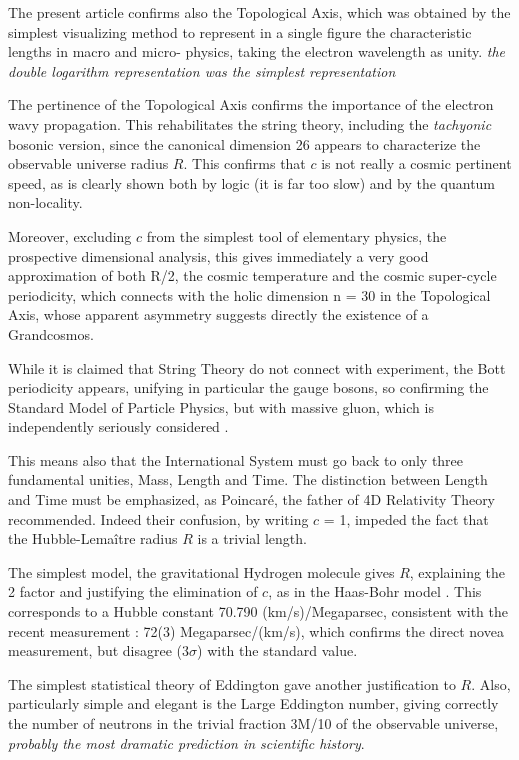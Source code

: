 \documentclass[twoside,draft]{article}
\begin{document}
\begin{sloppypar}
The present article confirms also the Topological Axis, which was obtained by the simplest visualizing method to represent in a single figure the characteristic lengths in macro and micro-
physics, taking the electron wavelength as unity. \textit {the double logarithm representation was the simplest representation}

The pertinence of the Topological Axis confirms
the importance of the electron wavy propagation. This rehabilitates the string theory, including the
\textit{tachyonic} bosonic version, since the canonical dimension 26 appears to characterize the observable
universe radius $R$. This confirms that $c$ is not really a cosmic pertinent speed, as is clearly shown both by
logic (it is far too slow) and by the quantum non-locality.

Moreover, excluding $c$ from the simplest tool of elementary physics, the prospective dimensional
analysis, this gives immediately a very good approximation of both R/2, the cosmic temperature and the cosmic super-cycle periodicity, which connects with the holic dimension n = 30 in the
Topological Axis, whose apparent asymmetry suggests directly the existence of a Grandcosmos.

While it is claimed that String Theory do not connect with experiment, the Bott periodicity
appears, unifying in particular the gauge bosons, so confirming the Standard Model of Particle Physics, but with
massive gluon, which is independently seriously considered \cite{Salingaros}.

This means also that the International System must go back to only three fundamental unities,
Mass, Length and Time. The distinction between Length and Time must be emphasized, as
Poincar\'{e}, the father of 4D Relativity Theory recommended. Indeed their confusion, by writing $c$ =
1, impeded the fact that the Hubble-Lema\^{i}tre radius $R$ is a trivial length.

The simplest model, the gravitational Hydrogen molecule gives $R$, explaining the 2 factor and
justifying the elimination of $c$, as in the Haas-Bohr model \cite{Sanchez1}. This corresponds to a Hubble constant 70.790
(km/s)/Megaparsec, consistent with the recent measurement \cite{Bonvin}: 72(3) Megaparsec/(km/s), which
confirms the direct novea measurement, but disagree (3$\sigma$) with the standard value.

The simplest statistical theory of Eddington gave another justification to $R$. Also, particularly
simple and elegant is the Large Eddington number, giving correctly the number of neutrons in the
trivial fraction 3M/10 of the observable universe, \textit{probably the most dramatic prediction in
 scientific history}.


\end{sloppypar}
\end{document}
